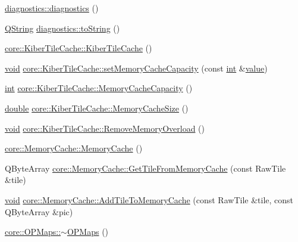 \begin{DoxyCompactItemize}
\item 
\hyperlink{group___o_p_map_widget_ga9fb2a8142ddf0bad7dc111d9f792f456}{diagnostics\-::diagnostics} ()
\item 
\hyperlink{group___u_a_v_objects_plugin_gab9d252f49c333c94a72f97ce3105a32d}{Q\-String} \hyperlink{group___o_p_map_widget_gac7639db946ccc37305c9a915ab7816cc}{diagnostics\-::to\-String} ()
\item 
\hyperlink{group___o_p_map_widget_gab36dfabac7ab5e960efd54b890b15173}{core\-::\-Kiber\-Tile\-Cache\-::\-Kiber\-Tile\-Cache} ()
\item 
\hyperlink{group___u_a_v_objects_plugin_ga444cf2ff3f0ecbe028adce838d373f5c}{void} \hyperlink{group___o_p_map_widget_ga53ccfe7e5f07ce218a4920d86b7fa95e}{core\-::\-Kiber\-Tile\-Cache\-::set\-Memory\-Cache\-Capacity} (const \hyperlink{ioapi_8h_a787fa3cf048117ba7123753c1e74fcd6}{int} \&\hyperlink{glext_8h_aa0e2e9cea7f208d28acda0480144beb0}{value})
\item 
\hyperlink{ioapi_8h_a787fa3cf048117ba7123753c1e74fcd6}{int} \hyperlink{group___o_p_map_widget_ga1ac798743593d55d294a659bf03cd367}{core\-::\-Kiber\-Tile\-Cache\-::\-Memory\-Cache\-Capacity} ()
\item 
\hyperlink{_super_l_u_support_8h_a8956b2b9f49bf918deed98379d159ca7}{double} \hyperlink{group___o_p_map_widget_ga79164b194a65febe6f0b0f29fec3e002}{core\-::\-Kiber\-Tile\-Cache\-::\-Memory\-Cache\-Size} ()
\item 
\hyperlink{group___u_a_v_objects_plugin_ga444cf2ff3f0ecbe028adce838d373f5c}{void} \hyperlink{group___o_p_map_widget_ga7c3b50dd97465e188bb3e322b9717c5f}{core\-::\-Kiber\-Tile\-Cache\-::\-Remove\-Memory\-Overload} ()
\item 
\hyperlink{group___o_p_map_widget_gacf3985e0ad4b9b8ec8753ba08bbfe5d4}{core\-::\-Memory\-Cache\-::\-Memory\-Cache} ()
\item 
Q\-Byte\-Array \hyperlink{group___o_p_map_widget_ga7a264bbfd35c0236a10afa3c474e689b}{core\-::\-Memory\-Cache\-::\-Get\-Tile\-From\-Memory\-Cache} (const Raw\-Tile \&tile)
\item 
\hyperlink{group___u_a_v_objects_plugin_ga444cf2ff3f0ecbe028adce838d373f5c}{void} \hyperlink{group___o_p_map_widget_ga6a459355ac3d41deedd783f9bef0ada8}{core\-::\-Memory\-Cache\-::\-Add\-Tile\-To\-Memory\-Cache} (const Raw\-Tile \&tile, const Q\-Byte\-Array \&pic)
\item 
\hyperlink{group___o_p_map_widget_ga7f09b75dc945740e40b6c0fa28998c51}{core\-::\-O\-P\-Maps\-::$\sim$\-O\-P\-Maps} ()
\item 

\end{DoxyCompactItemize}
